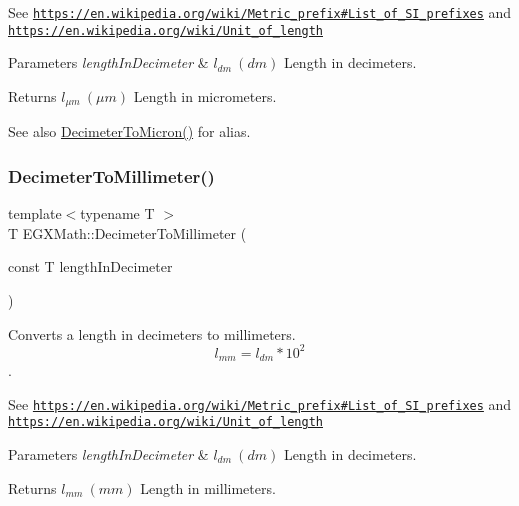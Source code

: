 See \href{https://en.wikipedia.org/wiki/Metric_prefix#List_of_SI_prefixes}{\tt https\+://en.\+wikipedia.\+org/wiki/\+Metric\+\_\+prefix\#\+List\+\_\+of\+\_\+\+S\+I\+\_\+prefixes} and \href{https://en.wikipedia.org/wiki/Unit_of_length}{\tt https\+://en.\+wikipedia.\+org/wiki/\+Unit\+\_\+of\+\_\+length} 
\begin{DoxyParams}{Parameters}
{\em length\+In\+Decimeter} & $ l_{dm}\ (dm)$ Length in decimeters. \\
\hline
\end{DoxyParams}
\begin{DoxyReturn}{Returns}
$ l_{\mu m}\ (\mu m)$ Length in micrometers. 
\end{DoxyReturn}
\begin{DoxySeeAlso}{See also}
\mbox{\hyperlink{group___e_g_x_math-_conversions-_length_conversions-_s_i-_decimeter-_non-_s_i_gaebafc6e167156bb5158e5d335b25334b}{Decimeter\+To\+Micron()}} for alias. 
\end{DoxySeeAlso}
\mbox{\label{group___e_g_x_math-_conversions-_length_conversions-_s_i-_decimeter-_s_i_gad899e8bf5ade8cdc82e00b0fc81c2ee5}} 
\subsubsection{\texorpdfstring{Decimeter\+To\+Millimeter()}{DecimeterToMillimeter()}}
{\footnotesize\ttfamily template$<$typename T $>$ \\
T E\+G\+X\+Math\+::\+Decimeter\+To\+Millimeter (\begin{DoxyParamCaption}\item[{const T}]{length\+In\+Decimeter }\end{DoxyParamCaption})}



Converts a length in decimeters to millimeters. \[ l_{mm}=l_{dm} * 10^{2} \]. 

See \href{https://en.wikipedia.org/wiki/Metric_prefix#List_of_SI_prefixes}{\tt https\+://en.\+wikipedia.\+org/wiki/\+Metric\+\_\+prefix\#\+List\+\_\+of\+\_\+\+S\+I\+\_\+prefixes} and \href{https://en.wikipedia.org/wiki/Unit_of_length}{\tt https\+://en.\+wikipedia.\+org/wiki/\+Unit\+\_\+of\+\_\+length} 
\begin{DoxyParams}{Parameters}
{\em length\+In\+Decimeter} & $ l_{dm}\ (dm)$ Length in decimeters. \\
\hline
\end{DoxyParams}
\begin{DoxyReturn}{Returns}
$ l_{mm}\ (mm)$ Length in millimeters. 
\end{DoxyReturn}
\mbox{\label{group___e_g_x_math-_conversions-_length_conversions-_s_i-_decimeter-_s_i_ga5bf2905937fea582ee35031d9017807f}} 
